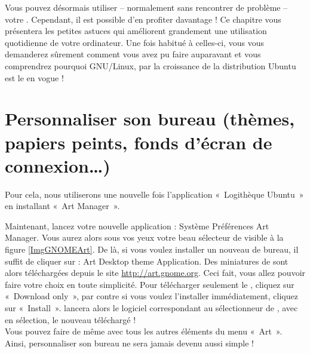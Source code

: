  {Vous pouvez désormais utiliser}{ -- normalement sans rencontrer de problème -- votre . Cependant, il est possible d'en profiter davantage ! Ce chapitre vous présentera les petites astuces qui améliorent grandement une utilisation quotidienne de votre ordinateur. Une fois habitué à celles-ci, vous vous demanderez sûrement comment vous avez pu faire auparavant et vous comprendrez pourquoi GNU/Linux, par la croissance de la distribution Ubuntu est le  en vogue !}
\label{ChapitreMieuxUtiliserGnome}
\section{Personnaliser son bureau (thèmes, papiers peints, fonds d'écran de connexion\ldots{})}
\label{RefInstallTheme}
Pour cela, nous utiliserons une nouvelle fois l'application «~Logithèque Ubuntu~» en installant «~Art Manager~».\par
{}
Maintenant, lancez votre nouvelle application : Système \FlecheDroite Préférences \FlecheDroite Art Manager. Vous aurez alors sous vos yeux votre beau sélecteur de  visible à la figure \ref{ImgGNOMEArt}. De là, si vous voulez installer un nouveau  de bureau, il suffit de cliquer sur : Art \FlecheDroite Desktop theme \FlecheDroite Application. Des miniatures de  sont alors téléchargées depuis le site \url{http://art.gnome.org}. Ceci fait, vous allez pouvoir faire votre choix en toute simplicité. Pour télécharger seulement le , cliquez sur «~Download only~», par contre si vous voulez l'installer immédiatement, cliquez sur «~Install~».  lancera alors le logiciel correspondant au sélectionneur de , avec en sélection, le nouveau  téléchargé !\\
Vous pouvez faire de même avec tous les autres éléments du menu «~Art~». Ainsi, personnaliser son bureau ne sera jamais devenu aussi simple !
